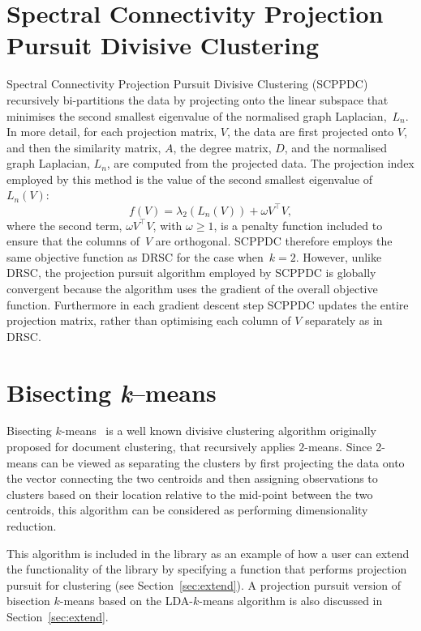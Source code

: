 \documentclass{book}
\begin{document}
\section{Spectral Connectivity Projection Pursuit Divisive Clustering}

Spectral Connectivity Projection Pursuit Divisive Clustering
(SCPPDC)~\cite{HofmeyrPE2018} recursively bi-partitions the data by projecting
onto the linear subspace that minimises the second smallest eigenvalue of the
normalised graph Laplacian,~$L_n$. 
%
In more detail, for each projection matrix, $V$, the data are first projected
onto $V$, and then the similarity matrix, $A$, the degree matrix, $D$, and the normalised graph
Laplacian, $L_n$, are computed from the projected data.
%
The projection index employed by this method is the value of the second
smallest eigenvalue of $L_n(V)$:
%
\[ f(V) = \lambda_2 \left(L_n(V) \right) + \omega V^\top V, \]
%
where the second term, $\omega V^\top V$, with
$\omega \geqslant 1$, is a penalty function included to ensure that the columns
of~$V$ are orthogonal.
%
SCPPDC therefore employs the same objective function as DRSC for the case when~$k=2$.
However, unlike DRSC, the projection pursuit algorithm employed by
SCPPDC is globally convergent because the algorithm uses the gradient of the
overall objective function. Furthermore in each gradient descent step SCPPDC
updates the entire projection matrix, rather than optimising each column of $V$
separately as in DRSC. 


\section{Bisecting {\it k}--means}

Bisecting $k$-means~\cite{SteinbachKK2000} is a well known divisive clustering
algorithm originally proposed for document clustering, that recursively applies
$2$-means. Since 2-means can be viewed as separating the clusters by first
projecting the data onto the vector connecting the two centroids and then
assigning observations to clusters based on their location relative to the
mid-point between the two centroids, this algorithm can be considered as
performing dimensionality reduction.

This algorithm is included in the library as an example of how a user can
extend the functionality of the library by specifying a function that performs
projection pursuit for clustering (see Section~\ref{sec:extend}).
%
A projection pursuit version of bisection $k$-means based on the
LDA-$k$-means algorithm is also discussed in Section~\ref{sec:extend}.
\end{document}
